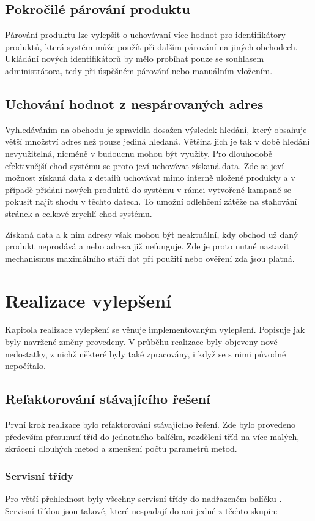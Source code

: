 \documentclass[thesis=B,czech]{FITthesis}[2012/06/26]
\begin{document}
\section{Pokročilé párování produktu}
Párování produktu lze vylepšit o uchovávaní více hodnot pro identifikátory produktů, která systém může použít při dalším 
párování na jiných obchodech. Ukládání nových identifikátorů by mělo probíhat pouze se souhlasem administrátora, tedy 
při úspěšném párování nebo manuálním vložením.

\section{Uchování hodnot z nespárovaných adres}
Vyhledáváním na obchodu je zpravidla dosažen výsledek hledání, který obsahuje větší množství adres než pouze
jediná hledaná. Většina jich je tak v době hledání nevyužitelná, nicméně v budoucnu mohou být využity. Pro dlouhodobě 
efektivnější chod systému se proto jeví uchovávat získaná data. Zde se jeví možnost získaná data z detailů uchovávat mimo interně uložené produkty
a v případě přidání nových produktů do systému v rámci vytvořené kampaně se pokusit najít shodu v těchto datech. To umožní odlehčení zátěže
na stahování stránek a celkové zrychlí chod systému.
\par
Získaná data a k nim adresy však mohou být neaktuální, kdy obchod už daný produkt neprodává a nebo adresa již nefunguje. Zde je proto nutné
nastavit mechanismus maximálního stáří dat při použití nebo ověření zda jsou platná.


\chapter{Realizace vylepšení}
Kapitola realizace vylepšení se věnuje implementovaným vylepšení. Popisuje jak byly navržené změny provedeny.
V průběhu realizace byly objeveny nové nedostatky, z nichž některé byly také zpracovány, i když se s nimi původně nepočítalo.

\section{Refaktorování stávajícího řešení}
První krok realizace bylo refaktorování stávajícího řešení. Zde bylo provedeno především přesunutí tříd do jednotného balíčku, 
rozdělení tříd na více malých, zkrácení dlouhých metod a zmenšení počtu parametrů metod.

\subsection{Servisní třídy}
Pro větší přehlednost byly všechny servisní třídy do nadřazeném balíčku . 
Servisní třídou jsou takové, které nespadají do ani jedné z těchto skupin:
\end{document}
